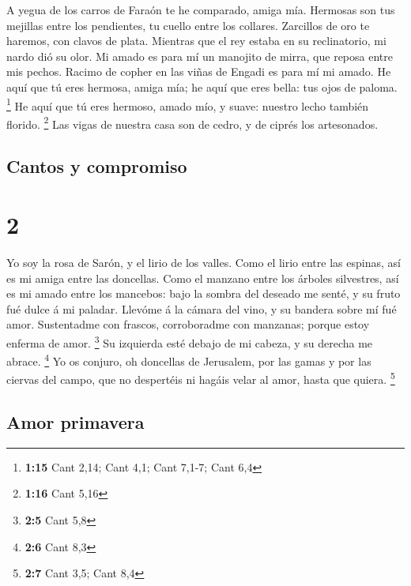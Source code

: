 A yegua de los carros de Faraón te he comparado, amiga
mía.  Hermosas son tus mejillas entre los pendientes, tu
cuello entre los collares.  Zarcillos de oro te haremos,
con clavos de plata.  Mientras que el rey estaba en su
reclinatorio, mi nardo dió su olor.  Mi amado es para mí
un manojito de mirra, que reposa entre mis pechos. 
Racimo de copher en las viñas de Engadi es para mí mi amado.
 He aquí que tú eres hermosa, amiga mía; he aquí que eres
bella: tus ojos de paloma. \footnote{\textbf{1:15} Cant 2,14; Cant 4,1;
  Cant 7,1-7; Cant 6,4}  He aquí que tú eres hermoso,
amado mío, y suave: nuestro lecho también florido. \footnote{\textbf{1:16}
  Cant 5,16}  Las vigas de nuestra casa son de cedro, y
de ciprés los artesonados.

\hypertarget{cantos-y-compromiso}{%
\subsection{Cantos y compromiso}\label{cantos-y-compromiso}}

\hypertarget{section-1}{%
\section{2}\label{section-1}}

 Yo soy la rosa de Sarón, y el lirio de los valles.
 Como el lirio entre las espinas, así es mi amiga entre
las doncellas.  Como el manzano entre los árboles
silvestres, así es mi amado entre los mancebos: bajo la sombra del
deseado me senté, y su fruto fué dulce á mi paladar. 
Llevóme á la cámara del vino, y su bandera sobre mí fué amor.
 Sustentadme con frascos, corroboradme con manzanas;
porque estoy enferma de amor. \footnote{\textbf{2:5} Cant 5,8}
 Su izquierda esté debajo de mi cabeza, y su derecha me
abrace. \footnote{\textbf{2:6} Cant 8,3}  Yo os conjuro,
oh doncellas de Jerusalem, por las gamas y por las ciervas del campo,
que no despertéis ni hagáis velar al amor, hasta que quiera. \footnote{\textbf{2:7}
  Cant 3,5; Cant 8,4}

\hypertarget{amor-primavera}{%
\subsection{Amor primavera}\label{amor-primavera}}

